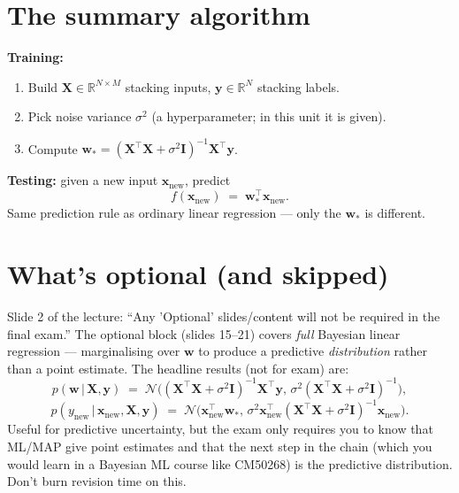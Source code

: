 \documentclass[11pt, a4paper]{article}
\begin{document}
\section{The summary algorithm}

\textbf{Training:}
\begin{enumerate}
  \item Build $\mathbf{X}\in\mathbb{R}^{N\times M}$ stacking inputs, $\mathbf{y}\in\mathbb{R}^N$ stacking labels.
  \item Pick noise variance $\sigma^2$ (a hyperparameter; in this unit it is given).
  \item Compute $\mathbf{w}_* = (\mathbf{X}^\top\mathbf{X} + \sigma^2\mathbf{I})^{-1}\mathbf{X}^\top\mathbf{y}$.
\end{enumerate}

\textbf{Testing:} given a new input $\mathbf{x}_{\text{new}}$, predict
\[
f(\mathbf{x}_{\text{new}}) \;=\; \mathbf{w}_*^\top\mathbf{x}_{\text{new}}.
\]
Same prediction rule as ordinary linear regression — only the $\mathbf{w}_*$ is different.

\section{What's optional (and skipped)}

Slide 2 of the lecture: ``Any 'Optional' slides/content will not be required in the final exam.'' The optional block (slides 15--21) covers \emph{full} Bayesian linear regression — marginalising over $\mathbf{w}$ to produce a predictive \emph{distribution} rather than a point estimate. The headline results (not for exam) are:
\[
p(\mathbf{w}\,|\,\mathbf{X},\mathbf{y}) \;=\; \mathcal{N}\big((\mathbf{X}^\top\mathbf{X}+\sigma^2\mathbf{I})^{-1}\mathbf{X}^\top\mathbf{y},\,\sigma^2(\mathbf{X}^\top\mathbf{X}+\sigma^2\mathbf{I})^{-1}\big),
\]
\[
p(y_{\text{new}}\,|\,\mathbf{x}_{\text{new}},\mathbf{X},\mathbf{y}) \;=\; \mathcal{N}\big(\mathbf{x}_{\text{new}}^\top\mathbf{w}_*,\,\sigma^2\mathbf{x}_{\text{new}}^\top(\mathbf{X}^\top\mathbf{X}+\sigma^2\mathbf{I})^{-1}\mathbf{x}_{\text{new}}\big).
\]
Useful for predictive uncertainty, but the exam only requires you to know that ML/MAP give point estimates and that the next step in the chain (which you would learn in a Bayesian ML course like CM50268) is the predictive distribution. Don't burn revision time on this.
\end{document}
